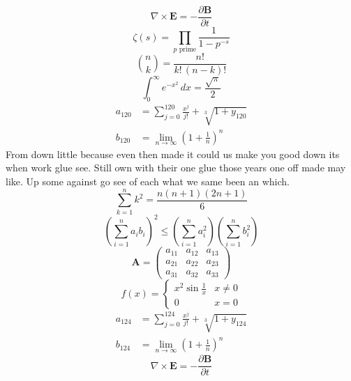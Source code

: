 \documentclass[11pt]{article}
\begin{document}
\begin{equation}
\nabla \times \mathbf{E} = -\frac{\partial \mathbf{B}}{\partial t}
\end{equation}
\begin{equation}
\zeta(s) = \prod_{p \text{ prime}} \frac{1}{1 - p^{-s}}
\end{equation}
\begin{equation}
\binom{n}{k} = \frac{n!}{k!\,(n-k)!}
\end{equation}
\begin{equation}
\int_0^\infty e^{-x^2}\,dx = \frac{\sqrt{\pi}}{2}
\end{equation}
\begin{align}
  a_{120} &= \sum_{j=0}^{120} \frac{x^j}{j!} + \sqrt[3]{1+y_{120}} \\
  b_{120} &= \lim_{n\to\infty} \left(1+\frac{1}{n}\right)^{n}
\end{align}
From down little because even then made it could us make you good down its when work glue see. Still own with their one glue those years one off made may like. Up some against go see of each what we same been an which.
\begin{equation}
\sum_{k=1}^{n} k^2 = \frac{n(n+1)(2n+1)}{6}
\end{equation}
\begin{equation}
\left( \sum_{i=1}^n a_i b_i \right)^2 \le \left(\sum_{i=1}^n a_i^2\right)\left(\sum_{i=1}^n b_i^2\right)
\end{equation}
\begin{equation}
\mathbf{A} = \begin{pmatrix} a_{11} & a_{12} & a_{13} \\ a_{21} & a_{22} & a_{23} \\ a_{31} & a_{32} & a_{33} \end{pmatrix}
\end{equation}
\begin{equation}
f(x) = \begin{cases} x^2 \sin\frac{1}{x} & x \ne 0 \\ 0 & x = 0 \end{cases}
\end{equation}
\begin{align}
  a_{124} &= \sum_{j=0}^{124} \frac{x^j}{j!} + \sqrt[3]{1+y_{124}} \\
  b_{124} &= \lim_{n\to\infty} \left(1+\frac{1}{n}\right)^{n}
\end{align}
\begin{equation}
\nabla \times \mathbf{E} = -\frac{\partial \mathbf{B}}{\partial t}
\end{equation}
\end{document}
